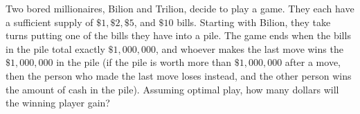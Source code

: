 Two bored millionaires, Bilion and Trilion, decide to play a game. They each have a sufficient supply of $\$ 1, \$ 2,\$ 5$, and $\$ 10$ bills. Starting with Bilion, they take turns putting one of the bills they have into a pile. The game ends when the bills in the pile total exactly $\$1{,}000{,}000$, and whoever makes the last move wins the $\$1{,}000{,}000$ in the pile (if the pile is worth more than $\$1{,}000{,}000$ after a move, then the person who made the last move loses instead, and the other person wins the amount of cash in the pile). Assuming optimal play, how many dollars will the winning player gain?
